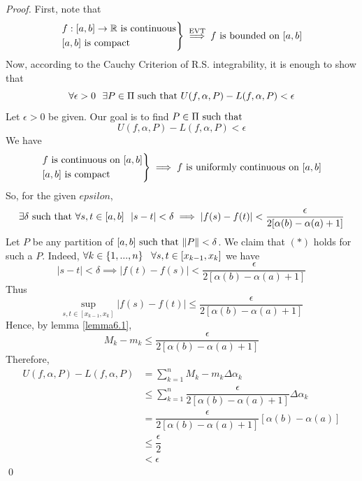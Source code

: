 \begin{proof}
    First, note that
    \begin{align*}
        \begin{rcases*}
            f:[a,b]\to \R \text{ is continuous} \\
            [a,b] \text{ is compact}
        \end{rcases*} \overset{\text{EVT}}{\implies} f \text{ is bounded on } [a,b]
    \end{align*}
    Now, according to the Cauchy Criterion of R.S. integrability, it is enough to show that 
    $$\forall \epsilon > 0 ~~\exists P \in \Pi \text{ such that } U(f, \alpha, P) - L(f, \alpha, P) < \epsilon$$
    Let $\epsilon > 0$ be given. Our goal is to find $P \in \Pi \text{ such that }$
    \begin{equation*}
        U(f, \alpha, P) - L(f, \alpha, P) < \epsilon \tag{$*$}
    \end{equation*}
    We have 
    \begin{align*}
        \begin{rcases*}
            \text{$f$ is continuous on $[a,b]$} \\
            [a,b] \text{ is compact}
        \end{rcases*} \implies \text{$f$ is uniformly continuous on $[a,b]$}
    \end{align*}
    So, for the given $epsilon$,
    $$\exists \delta \text{ such that } \forall s, t \in [a,b] ~~|s-t| < \delta \implies \left|f(s) - f(t)\right| < \dfrac{\epsilon}{2[\alpha(b) - \alpha(a) + 1]}$$
    Let $P$ be any partition of $[a,b] \text{ such that } \|P\| < \delta$. We claim that $(*)$ holds for such a $P$. Indeed, $\forall k \in \left\{1, ..., n\right\} ~~\forall s, t \in [x_{k-1}, x_k]$ we have 
    $$|s-t| < \delta \implies |f(t) - f(s)| < \dfrac{\epsilon}{2[\alpha(b) - \alpha(a) +1]}$$
    Thus 
    $$\sup \limits_{s,t \in [x_{k-1}, x_k]} |f(s) - f(t)| \leq \dfrac{\epsilon}{2[\alpha(b) - \alpha(a) + 1]}$$
    Hence, by lemma \ref{lemma6.1},
    $$M_k - m_k \leq \dfrac{\epsilon}{2[\alpha(b) - \alpha(a) + 1]}$$
    Therefore, 
    \begin{align*}
        U(f, \alpha, P) - L(f, \alpha, P) &= \sum_{k=1}^{n}M_k - m_k \Delta \alpha_k \\
        &\leq \sum_{k=1}^{n} \dfrac{\epsilon}{2[\alpha(b) - \alpha(a) +1]} \Delta \alpha_k \\
        &= \dfrac{\epsilon}{2[\alpha(b) - \alpha(a) + 1]} [\alpha(b) -\alpha(a)] \\ 
        &\leq \dfrac{\epsilon}{2} \\ 
        &< \epsilon
    \end{align*}
    \qed
\end{proof}

